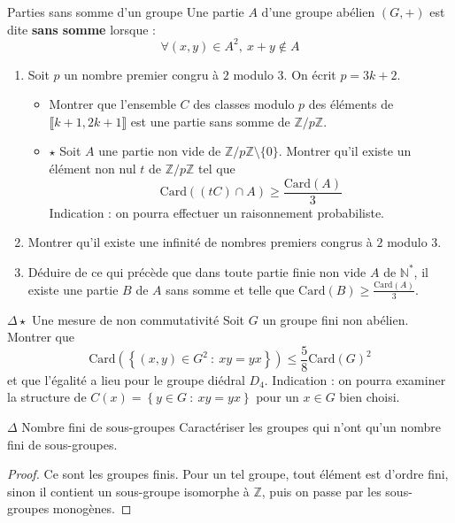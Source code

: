 \documentclass[french,a4paper]{article}
\newcommand{\N}{\mathbb{N}}
\newcommand{\Z}{\mathbb{Z}}
\newcommand{\st}{^*}
\newcommand{\card}{\text{Card}}
\theoremstyle{plain}
\theoremstyle{definition}
\theoremstyle{remark}
\begin{document}
\begin{ex}[Moulin.AG.13]{Parties sans somme d'un groupe}
	Une partie $A$ d'une groupe abélien $(G,+)$ est dite \textbf{sans somme} lorsque : $$\forall (x,y)\in A^2,\ x+y\notin A$$
	\begin{enumerate}
		\item Soit $p$ un nombre premier congru à $2$ modulo $3$. On écrit $p=3k+2$.
		\begin{itemize}
			\item Montrer que l'ensemble $C$ des classes modulo $p$ des éléments de $\llbracket k+1,2k+1\rrbracket$ est une partie sans somme de $\Z/p\Z$.
			\item $\star$ Soit $A$ une partie non vide de $\Z/p\Z\setminus\{0\}$. Montrer qu'il existe un élément non nul $t$ de $\Z/p\Z$ tel que $$\card((tC)\cap A)\geqslant\frac{\card(A)}{3}$$ Indication : on pourra effectuer un raisonnement probabiliste.
		\end{itemize}
		\item Montrer qu'il existe une infinité de nombres premiers congrus à $2$ modulo $3$.
		\item Déduire de ce qui précède que dans toute partie finie non vide $A$ de $\N\st$, il existe une partie $B$ de $A$ sans somme et telle que $\displaystyle\card(B)\geqslant\frac{\card(A)}{3}$.
	\end{enumerate}
\end{ex}

\begin{ex}[Moulin.AG.14]{$\Delta\star$ Une mesure de non commutativité}
	Soit $G$ un groupe fini non abélien. Montrer que $$\card\left(\left\{(x,y)\in G^2\ : \ xy=yx\right\}\right)\leqslant\frac{5}{8}\card(G)^2$$ et que l'égalité a lieu pour le groupe diédral $D_4$. Indication : on pourra examiner la structure de $C(x)=\left\{y\in G\ : \ xy=yx\right\}$ pour un $x\in G$ bien choisi.
\end{ex}

\begin{ex}[Moulin.AG.15 / X]{$\Delta$ Nombre fini de sous-groupes}
	Caractériser les groupes qui n'ont qu'un nombre fini de sous-groupes.
\end{ex}

\begin{proof}
	Ce sont les groupes finis. Pour un tel groupe, tout élément est d'ordre fini, sinon il contient un sous-groupe isomorphe à $\Z$, puis on passe par les sous-groupes monogènes.
\end{proof}
\end{document}
